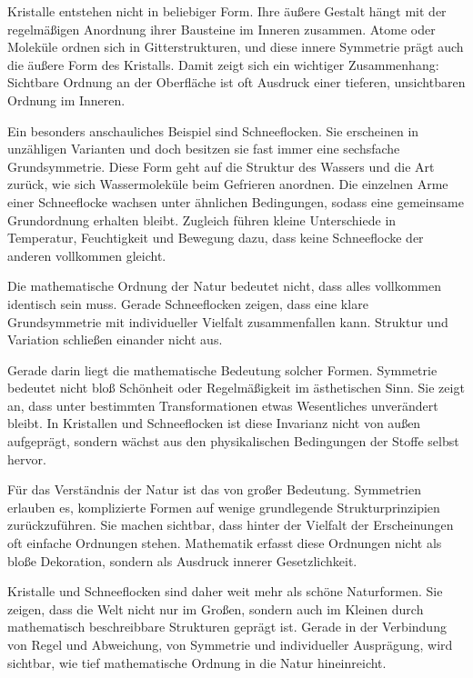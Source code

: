 Kristalle entstehen nicht in beliebiger Form.
Ihre äußere Gestalt hängt mit der regelmäßigen Anordnung ihrer Bausteine im Inneren zusammen.
Atome oder Moleküle ordnen sich in Gitterstrukturen,
und diese innere Symmetrie prägt auch die äußere Form des Kristalls.
Damit zeigt sich ein wichtiger Zusammenhang:
Sichtbare Ordnung an der Oberfläche ist oft Ausdruck einer tieferen,
unsichtbaren Ordnung im Inneren.

Ein besonders anschauliches Beispiel sind Schneeflocken.
Sie erscheinen in unzähligen Varianten
und doch besitzen sie fast immer eine sechsfache Grundsymmetrie.
Diese Form geht auf die Struktur des Wassers
und die Art zurück,
wie sich Wassermoleküle beim Gefrieren anordnen.
Die einzelnen Arme einer Schneeflocke wachsen unter ähnlichen Bedingungen,
sodass eine gemeinsame Grundordnung erhalten bleibt.
Zugleich führen kleine Unterschiede in Temperatur,
Feuchtigkeit
und Bewegung dazu,
dass keine Schneeflocke der anderen vollkommen gleicht.

\begin{DidacticBox}
	\label{box:symmetrie-variation}
	Die mathematische Ordnung der Natur bedeutet nicht,
	dass alles vollkommen identisch sein muss.
	Gerade Schneeflocken zeigen,
	dass eine klare Grundsymmetrie mit individueller Vielfalt zusammenfallen kann.
	Struktur und Variation schließen einander nicht aus.
\end{DidacticBox}

Gerade darin liegt die mathematische Bedeutung solcher Formen.
Symmetrie bedeutet nicht bloß Schönheit oder Regelmäßigkeit im ästhetischen Sinn.
Sie zeigt an,
dass unter bestimmten Transformationen etwas Wesentliches unverändert bleibt.
In Kristallen und Schneeflocken ist diese Invarianz nicht von außen aufgeprägt,
sondern wächst aus den physikalischen Bedingungen der Stoffe selbst hervor.

Für das Verständnis der Natur ist das von großer Bedeutung.
Symmetrien erlauben es,
komplizierte Formen auf wenige grundlegende Strukturprinzipien zurückzuführen.
Sie machen sichtbar,
dass hinter der Vielfalt der Erscheinungen oft einfache Ordnungen stehen.
Mathematik erfasst diese Ordnungen nicht als bloße Dekoration,
sondern als Ausdruck innerer Gesetzlichkeit.

Kristalle und Schneeflocken sind daher weit mehr als schöne Naturformen.
Sie zeigen,
dass die Welt nicht nur im Großen,
sondern auch im Kleinen durch mathematisch beschreibbare Strukturen geprägt ist.
Gerade in der Verbindung von Regel und Abweichung,
von Symmetrie und individueller Ausprägung,
wird sichtbar,
wie tief mathematische Ordnung in die Natur hineinreicht.

